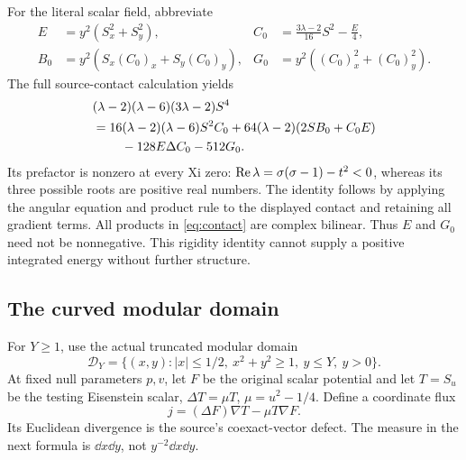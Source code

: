 For the literal scalar field, abbreviate
\begin{align*}
 E&=y^2(S_x^2+S_y^2),&
 C_0&=\frac{3\lambda-2}{16}S^2-\frac E4,\\
 B_0&=y^2(S_x(C_0)_x+S_y(C_0)_y),&
 G_0&=y^2((C_0)_x^2+(C_0)_y^2).
\end{align*}
The full source-contact calculation yields
\begin{align}\label{eq:contact}
 &(\lambda-2)(\lambda-6)(3\lambda-2)S^4\nonumber\\
 &=16(\lambda-2)(\lambda-6)S^2C_0
 +64(\lambda-2)(2SB_0+C_0E)\nonumber\\
 &\hspace{8mm}-128E\Delta C_0-512G_0.
\end{align}
Its prefactor is nonzero at every Xi zero: \(\operatorname{Re}\lambda=\sigma(\sigma-1)-t^2<0\), whereas its three possible roots are positive real numbers. The identity follows by applying the angular equation and product rule to the displayed contact and retaining all gradient terms.
All products in \eqref{eq:contact} are complex bilinear. Thus \(E\) and \(G_0\) need not be nonnegative. This rigidity identity cannot supply a positive integrated energy without further structure.

\subsection{The curved modular domain}

For \(Y\ge1\), use the actual truncated modular domain
\[
 \mathcal D_Y=\{(x,y):|x|\le1/2,\ x^2+y^2\ge1,\ y\le Y,\ y>0\}.
\]
At fixed null parameters \(p,v\), let \(F\) be the original scalar potential and let \(T=S_u\) be the testing Eisenstein scalar, \(\Delta T=\mu T\), \(\mu=u^2-1/4\). Define a coordinate flux
\[
 j=(\Delta F)\nabla T-\mu T\nabla F.
\]
Its Euclidean divergence is the source's coexact-vector defect. The measure in the next formula is \(\dd x\dd y\), not \(y^{-2}\dd x\dd y\).

